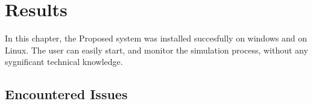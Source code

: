 \chapter{Results}
In this chapter, the
Proposed system was installed succesfully on windows and on Linux. The user can easily start, and monitor the simulation process, without any sygnificant technical knowledge.
\section{Encountered Issues}
